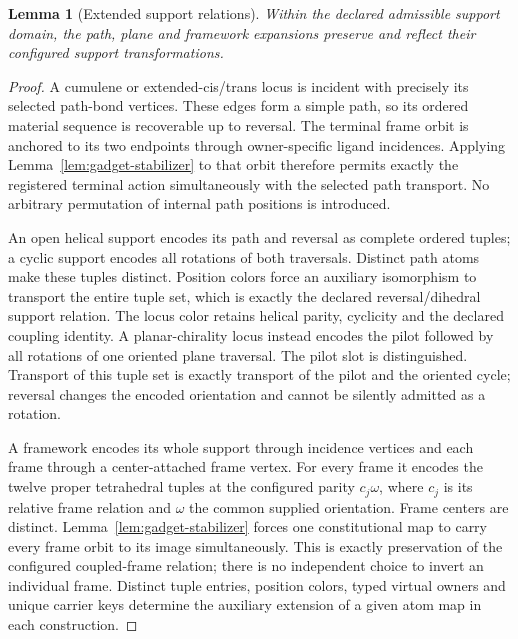 \documentclass[pdflatex,sn-mathphys-num,referee,lineno]{sn-jnl}
\theoremstyle{plain}
\newtheorem{lemma}[theorem]{Lemma}
\theoremstyle{remark}
\theoremstyle{definition}
\begin{document}
\begin{lemma}[Extended support relations]
\label{lem:extended-relations}
Within the declared admissible support domain, the path, plane and framework
expansions preserve and reflect their configured support transformations.
\end{lemma}

\begin{proof}
A cumulene or extended-cis/trans locus is incident with precisely its selected
path-bond vertices. These edges form a simple path, so its ordered material
sequence is recoverable up to reversal. The terminal frame orbit is anchored
to its two endpoints through owner-specific ligand incidences. Applying
Lemma~\ref{lem:gadget-stabilizer} to that orbit therefore permits exactly the
registered terminal action simultaneously with the selected path transport.
No arbitrary permutation of internal path positions is introduced.

An open helical support encodes its path and reversal as complete ordered
tuples; a cyclic support encodes all rotations of both traversals. Distinct
path atoms make these tuples distinct. Position colors force an auxiliary
isomorphism to transport the entire tuple set, which is exactly the declared
reversal/dihedral support relation. The locus color retains helical parity,
cyclicity and the declared coupling identity. A planar-chirality locus instead
encodes the pilot followed by all rotations of one oriented plane traversal.
The pilot slot is distinguished. Transport of this tuple set is exactly
transport of the pilot and the oriented cycle; reversal changes the encoded
orientation and cannot be silently admitted as a rotation.

A framework encodes its whole support through incidence vertices and each
frame through a center-attached frame vertex. For every frame it encodes the
twelve proper tetrahedral tuples at the configured parity
\(c_j\omega\), where \(c_j\) is its relative frame relation and
\(\omega\) the common supplied orientation. Frame centers are distinct.
Lemma~\ref{lem:gadget-stabilizer} forces one constitutional map to carry every
frame orbit to its image simultaneously. This is exactly preservation of the
configured coupled-frame relation; there is no independent choice to invert
an individual frame. Distinct tuple entries, position colors, typed virtual
owners and unique carrier keys determine the auxiliary extension of a given
atom map in each construction.
\end{proof}
\end{document}
